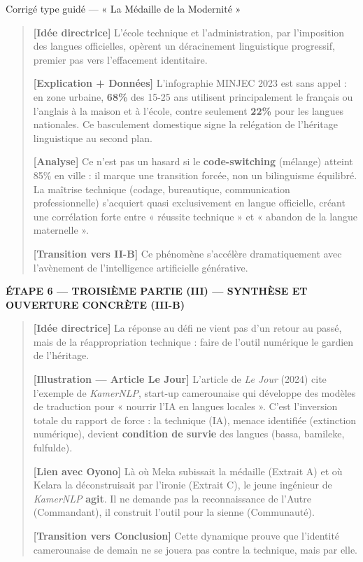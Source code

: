 \documentclass[11pt]{article}
\newcommand{\cle}[1]{{\popxbold\color{popdark}#1}}
\begin{document}
\begin{exoresolu}{Corrigé type guidé — « La Médaille de la Modernité »}
\begin{quote}
    \textbf{[Idée directrice]} L'école technique et l'administration, par l'imposition des langues officielles, opèrent un \cle{déracinement linguistique} progressif, premier pas vers l'effacement identitaire.
    
    \textbf{[Explication + Données]} L'infographie MINJEC 2023 est sans appel : en zone urbaine, \textbf{68\%} des 15-25 ans utilisent principalement le français ou l'anglais à la maison et à l'école, contre seulement \textbf{22\%} pour les langues nationales. Ce basculement domestique signe la relégation de l'héritage linguistique au second plan.
    
    \textbf{[Analyse]} Ce n'est pas un hasard si le \textbf{code-switching} (mélange) atteint 85\% en ville : il marque une transition forcée, non un bilinguisme équilibré. La maîtrise technique (codage, bureautique, communication professionnelle) s'acquiert quasi exclusivement en langue officielle, créant une \cle{corrélation forte} entre « réussite technique » et « abandon de la langue maternelle ».
    
    \textbf{[Transition vers II-B]} Ce phénomène s'accélère dramatiquement avec l'avènement de l'intelligence artificielle générative.
\end{quote}

\textbf{ÉTAPE 6 — TROISIÈME PARTIE (III) — SYNTHÈSE ET OUVERTURE CONCRÈTE (III-B)}

\begin{quote}
    \textbf{[Idée directrice]} La réponse au défi ne vient pas d'un retour au passé, mais de la \cle{réappropriation technique} : faire de l'outil numérique le gardien de l'héritage.
    
    \textbf{[Illustration — Article Le Jour]} L'article de \emph{Le Jour} (2024) cite l'exemple de \emph{KamerNLP}, start-up camerounaise qui développe des modèles de traduction pour « nourrir l'IA en langues locales ». C'est l'inversion totale du rapport de force : la technique (IA), menace identifiée (extinction numérique), devient \textbf{condition de survie} des langues (bassa, bamileke, fulfulde).
    
    \textbf{[Lien avec Oyono]} Là où Meka subissait la médaille (Extrait A) et où Kelara la déconstruisait par l'ironie (Extrait C), le jeune ingénieur de \emph{KamerNLP} \textbf{agit}. Il ne demande pas la reconnaissance de l'Autre (Commandant), il construit l'outil pour la sienne (Communauté).
    
    \textbf{[Transition vers Conclusion]} Cette dynamique prouve que l'identité camerounaise de demain ne se jouera pas \og contre \fg{} la technique, mais \og par \fg{} elle.
\end{quote}


\end{exoresolu}
\end{document}
